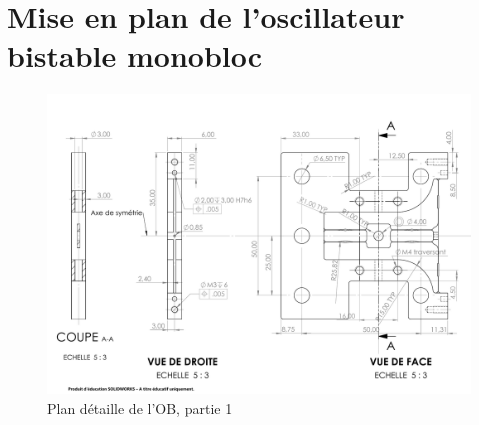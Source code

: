 
\appendix
\renewcommand\chaptername{Annexe~}

\lhead[\fancyplain{}{\leftmark}]%
      {\fancyplain{}{}} %
\chead[\fancyplain{}{}]%
      {\fancyplain{}{}}
\rhead[\fancyplain{}{}]%
      {\fancyplain{}{\rightmark}}%
\lfoot[\fancyplain{}{}]%
      {\fancyplain{}{}}
\cfoot[\fancyplain{}{\thepage}]%
      {\fancyplain{}{\thepage}} %
\rfoot[\fancyplain{}{}]%
     {\fancyplain{}{\scriptsize}}



\chapter{Mise en plan de l'oscillateur bistable monobloc}
\label{Ann:1_mise en plan OB}

\minitoc
\newpage

\begin{landscape}
\begin{figure}[!h]
\begin{center}
\includegraphics[page=1,trim={0.5cm 0cm 0cm 2cm},clip,scale=0.75]{../Chap3/Figure/bloc_APX4_final_6mm_paysageA4.pdf}
\end{center}
\caption{Plan détaille de l'OB, partie 1}\label{fig:Plan_OB_détaillé_1}
\end{figure}
\end{landscape}

